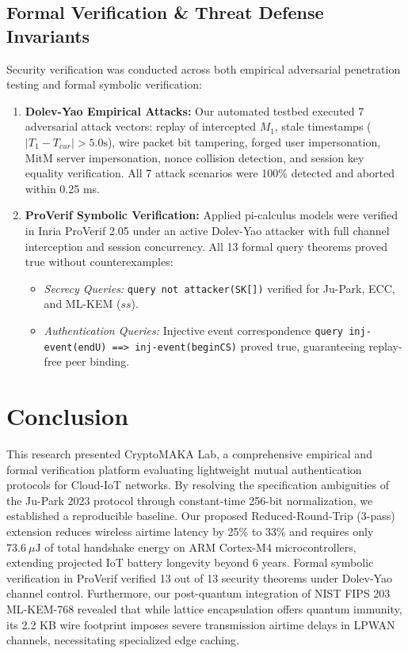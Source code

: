 \documentclass[journal,10pt,twocolumn]{IEEEtran}
\begin{document}
\subsection{Formal Verification \& Threat Defense Invariants}
Security verification was conducted across both empirical adversarial penetration testing and formal symbolic verification:
\begin{enumerate}
    \item \textbf{Dolev-Yao Empirical Attacks:} Our automated testbed executed 7 adversarial attack vectors: replay of intercepted $M_1$, stale timestamps ($|T_1 - T_{cur}| > 5.0\text{s}$), wire packet bit tampering, forged user impersonation, MitM server impersonation, nonce collision detection, and session key equality verification. All 7 attack scenarios were 100\% detected and aborted within 0.25 ms.
    \item \textbf{ProVerif Symbolic Verification:} Applied pi-calculus models were verified in Inria ProVerif 2.05 under an active Dolev-Yao attacker with full channel interception and session concurrency. All 13 formal query theorems proved true without counterexamples:
    \begin{itemize}
        \item \emph{Secrecy Queries:} \texttt{query not attacker(SK[])} verified for Ju-Park, ECC, and ML-KEM ($ss$).
        \item \emph{Authentication Queries:} Injective event correspondence \texttt{query inj-event(endU) ==> inj-event(beginCS)} proved true, guaranteeing replay-free peer binding.
    \end{itemize}
\end{enumerate}

\section{Conclusion}
This research presented CryptoMAKA Lab, a comprehensive empirical and formal verification platform evaluating lightweight mutual authentication protocols for Cloud-IoT networks. By resolving the specification ambiguities of the Ju-Park 2023 protocol through constant-time 256-bit normalization, we established a reproducible baseline. Our proposed Reduced-Round-Trip (3-pass) extension reduces wireless airtime latency by 25\% to 33\% and requires only $73.6\ \mu\text{J}$ of total handshake energy on ARM Cortex-M4 microcontrollers, extending projected IoT battery longevity beyond 6 years. Formal symbolic verification in ProVerif verified 13 out of 13 security theorems under Dolev-Yao channel control. Furthermore, our post-quantum integration of NIST FIPS 203 ML-KEM-768 revealed that while lattice encapsulation offers quantum immunity, its 2.2 KB wire footprint imposes severe transmission airtime delays in LPWAN channels, necessitating specialized edge caching.
\end{document}
